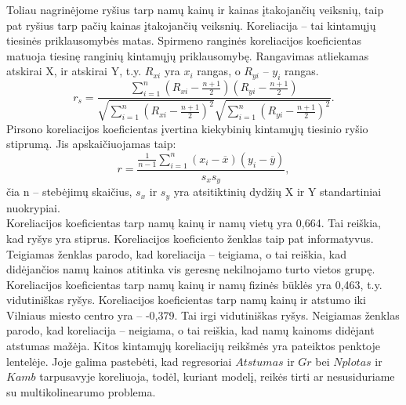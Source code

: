 \documentclass[a4paper]{article}
\begin{document}
\hspace*{0,01cm}Toliau nagrinėjome ryšius tarp namų kainų ir kainas įtakojančių veiksnių, taip pat ryšius tarp pačių kainas įtakojančių veiksnių. Koreliacija -- tai kintamųjų tiesinės priklausomybės matas. Spirmeno ranginės koreliacijos koeficientas matuoja tiesinę ranginių kintamųjų priklausomybę. Rangavimas atliekamas atskirai X, ir atskirai Y, t.y. $R_{xi}$ yra $x_i$ rangas, o $R_{yi}$ -- $y_i$ rangas.
\begin{equation}
r_s=\frac{\sum_{i=1}^{n}(R_{xi}-\frac{n+1}{2})(R_{yi}-\frac{n+1}{2})}{\sqrt{\sum_{i=1}^{n}(R_{xi}-\frac{n+1}{2})^2}\sqrt{\sum_{i=1}^{n}(R_{yi}-\frac{n+1}{2})^2}}.
\end{equation}
Pirsono koreliacijos koeficientas įvertina kiekybinių kintamųjų tiesinio ryšio stiprumą. Jis apskaičiuojamas taip:
\begin{equation}
r=\frac{\frac{1}{n-1}\sum_{i=1}^{n}(x_i-\overline{x})(y_i-\overline{y})}{s_x s_y},
\end{equation}
čia n -- stebėjimų skaičius, $s_x$ ir $s_y$ yra atsitiktinių dydžių X ir Y standartiniai nuokrypiai.\\
\hspace*{0,52cm}Koreliacijos koeficientas tarp namų kainų ir namų vietų yra 0,664. Tai reiškia, kad ryšys yra stiprus. Koreliacijos koeficiento ženklas taip pat informatyvus. Teigiamas ženklas parodo, kad koreliacija -- teigiama, o tai reiškia, kad didėjančios namų kainos atitinka vis geresnę nekilnojamo turto vietos grupę. Koreliacijos koeficientas tarp namų kainų ir namų fizinės būklės yra 0,463, t.y. vidutiniškas ryšys. Koreliacijos koeficientas tarp namų kainų ir atstumo iki Vilniaus miesto centro yra -- -0,379. Tai irgi vidutiniškas ryšys. Neigiamas ženklas parodo, kad koreliacija -- neigiama, o tai reiškia, kad namų kainoms didėjant atstumas mažėja. Kitos kintamųjų koreliacijų reikšmės yra pateiktos penktoje lentelėje. Joje galima pastebėti, kad regresoriai $Atstumas$ ir $Gr$ bei $Nplotas$ ir $Kamb$ tarpusavyje koreliuoja, todėl, kuriant modelį, reikės tirti ar nesusiduriame su multikolinearumo problema.\\
\end{document}
